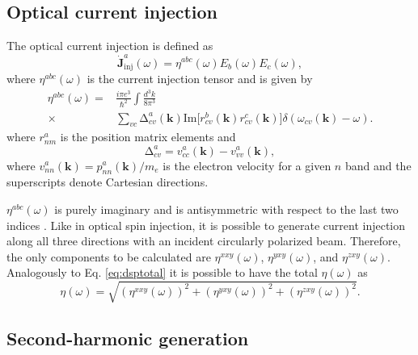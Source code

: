 \documentclass[pss]{wiley2sp} %
\begin{document}
\subsection{Optical current injection}\label{sec:theory-OCI}

The optical current injection is defined as
\begin{equation*}
\mathbf{\dot{J}}^{a}_{\text{inj}}(\omega) =
\eta^{abc}(\omega)E_{b}(\omega)E_{c}(\omega), \label{eq:eta}
\end{equation*}
where $\eta^{abc}(\omega)$ is the current injection tensor and is given by
\begin{align*}
\eta^{abc}(\omega) =& \frac{i\pi e^{3}}{\hbar^{2}}\int\frac{d^{3}k}{8\pi^{3}}
\nonumber \\
\times &
\sum_{vc}\mathrm{\Delta}^{a}_{cv}(\mathbf{k})\text{Im}\big[r^{b}_{cv}(\mathbf{k})
r^{c}_{cv}(\mathbf{k})\big]\delta(\omega_{cv}(\mathbf{k})-\omega).
\end{align*}
where $r^{a}_{nm}$ is the position matrix elements and 
\begin{equation*}
\mathrm{\Delta}^{a}_{cv} = v^{a}_{cc}(\mathbf{k})-v^{a}_{vv}(\mathbf{k}),
\end{equation*}
where $v^{a}_{nn}(\mathbf{k})=p^{a}_{nn}(\mathbf{k})/m_{e}$ is the electron
velocity for a given $n$ band and the superscripts denote Cartesian
directions.

$\eta^{abc}(\omega)$ is purely imaginary and is antisymmetric with respect to
the last two indices \cite{arzatePRB14,sipePRB00,nastosPRB10}. Like in optical spin
injection, it is possible to generate current injection along all three
directions with an incident circularly polarized beam. Therefore, the only
components to be calculated are $\eta^{xxy}(\omega)$, $\eta^{yxy}(\omega)$,
and $\eta^{zxy}(\omega)$. Analogously to Eq.
\eqref{eq:dsptotal} it is possible to have the total $\eta(\omega)$ \cite{arzatePRB14} as
\begin{equation}\label{eq:etatotal}
\eta(\omega) =
\sqrt{(\eta^{xxy}(\omega))^{2} +
      (\eta^{yxy}(\omega))^{2} +
      (\eta^{zxy}(\omega))^{2}
      }.
\end{equation}


\subsection{Second-harmonic generation}\label{sec:theory-SHG}
\end{document}
